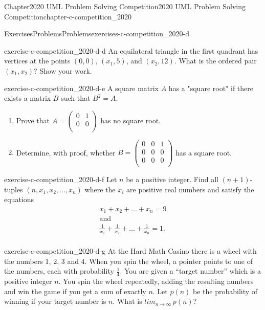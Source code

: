 \documentclass[oneside,10pt,]{book}
\numberwithin{equation}{section}
\begin{document}
\begin{chapterptx}{Chapter}{2020 UML Problem Solving Competition}{}{2020 UML Problem Solving Competition}{}{}{chapter-c-competition_2020}
\begin{exercises-section}{Exercises}{Problems}{}{Problems}{}{}{exercises-c-competition_2020-d}
\begin{divisionexercise}{3}{}{}{exercise-c-competition_2020-d-d}
An equilateral triangle in the first quadrant has vertices at the points \((0, 0)\), \((x_1, 5)\), and \((x_2, 12)\). What is the ordered pair \((x_1, x_2)\)?  Show your work.%
\end{divisionexercise}%
\begin{divisionexercise}{4}{}{}{exercise-c-competition_2020-d-e}%
A square matrix \(A\) has a "square root" if there exists a matrix \(B\) such that \(B^2 = A\).%
\begin{enumerate}[label=(\alph*)]
\item{}Prove that \(A = \left(
\begin{array}{cc}
0 & 1 \\
0 & 0 \\
\end{array}
\right)\)  has no square root.%
\item{}Determine, with proof, whether \(B=\left(
\begin{array}{ccc}
0 & 0 & 1 \\
0 & 0 & 0 \\
0 & 0 & 0 \\
\end{array}
\right)\) has a square root.%
\end{enumerate}
%
\end{divisionexercise}%
\begin{divisionexercise}{5}{}{}{exercise-c-competition_2020-d-f}%
Let \(n\) be a positive integer.  Find all \((n+1)\)-tuples \((n, x_1, x_2, \dots , x_n)\) where the \(x_i\) are positive real numbers and satisfy the equations%
\begin{equation*}
\begin{array}{cc}
x_1 + x_2 + \dots + x_n = 9 \\
\textrm{and}\\
\frac{1}{x_1}+\frac{1}{x_2} + \dots + \frac{1}{x_n} = 1. \\
\end{array}
\end{equation*}
%
\end{divisionexercise}%
\begin{divisionexercise}{6}{}{}{exercise-c-competition_2020-d-g}%
At the Hard Math Casino there is a wheel with the numbers 1, 2, 3 and 4.  When you spin the wheel, a pointer points to one of the numbers, each with probability \(\frac{1}{4}\). You are given a “target number” which  is a positive integer \(n\). You spin the wheel repeatedly, adding the resulting  numbers and win the game if you get a sum of exactly \(n\). Let \(p(n)\) be the probability of winning if your target number is \(n\).  What is \(lim_{n\rightarrow \infty}\, p(n)\)?%
\end{divisionexercise}%
\end{exercises-section}
\end{chapterptx}
\end{document}
